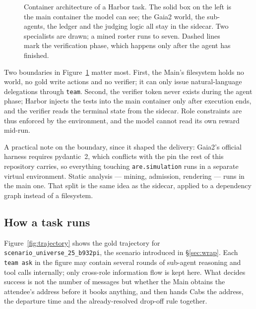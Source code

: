 \documentclass[11pt,a4paper]{article}
\begin{document}
\begin{figure}[H]
\caption{Container architecture of a Harbor task. The solid box on the left is the main container the model can see; the Gaia2 world, the sub-agents, the ledger and the judging logic all stay in the sidecar. Two specialists are drawn; a mined roster runs to seven. Dashed lines mark the verification phase, which happens only after the agent has finished.}
\label{fig:architecture}
\end{figure}

Two boundaries in Figure~\ref{fig:architecture} matter most. First, the Main's filesystem holds no world, no gold write actions and no verifier; it can only issue natural-language delegations through \texttt{team}. Second, the verifier token never exists during the agent phase; Harbor injects the tests into the main container only after execution ends, and the verifier reads the terminal state from the sidecar. Role constraints are thus enforced by the environment, and the model cannot read its own reward mid-run.

A practical note on the boundary, since it shaped the delivery: Gaia2's official harness requires pydantic~2, which conflicts with the pin the rest of this repository carries, so everything touching \texttt{are.simulation} runs in a separate virtual environment. Static analysis --- mining, admission, rendering --- runs in the main one. That split is the same idea as the sidecar, applied to a dependency graph instead of a filesystem.

\subsection{How a task runs}

Figure~\ref{fig:trajectory} shows the gold trajectory for \texttt{scenario\_universe\_25\_b932pi}, the scenario introduced in \S\ref{sec:wrap}. Each \texttt{team ask} in the figure may contain several rounds of sub-agent reasoning and tool calls internally; only cross-role information flow is kept here. What decides success is not the number of messages but whether the Main obtains the attendee's address before it books anything, and then hands Cabs the address, the departure time and the already-resolved drop-off rule together.
\end{document}

